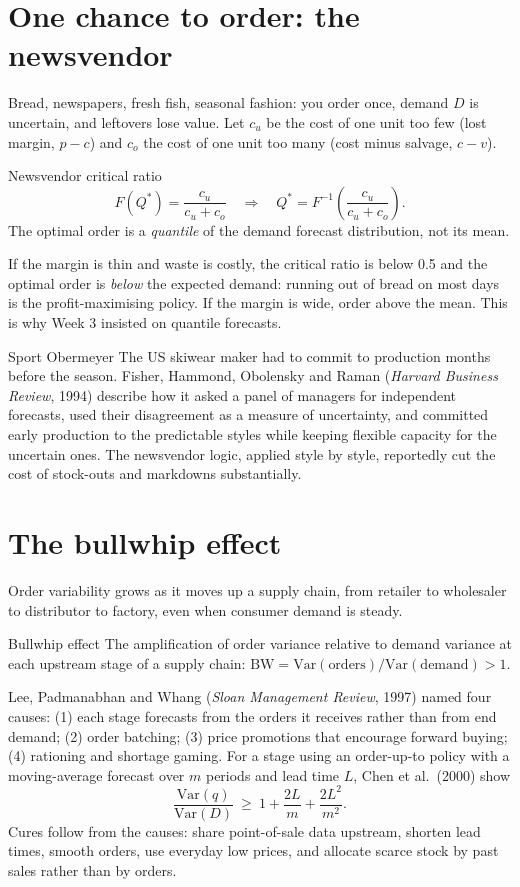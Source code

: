 \section{One chance to order: the newsvendor}
Bread, newspapers, fresh fish, seasonal fashion: you order once, demand $D$ is uncertain, and leftovers lose value.
Let $c_u$ be the cost of one unit too few (lost margin, $p-c$) and $c_o$ the cost of one unit too many (cost minus
salvage, $c-v$).
\begin{keyformula}{Newsvendor critical ratio}
\[ F(Q^*)=\frac{c_u}{c_u+c_o}\quad\Longrightarrow\quad Q^*=F^{-1}\!\left(\frac{c_u}{c_u+c_o}\right). \]
The optimal order is a \emph{quantile} of the demand forecast distribution, not its mean.
\end{keyformula}
If the margin is thin and waste is costly, the critical ratio is below 0.5 and the optimal order is \emph{below} the
expected demand: running out of bread on most days is the profit-maximising policy. If the margin is wide, order
above the mean. This is why Week 3 insisted on quantile forecasts.

\begin{realcase}{Sport Obermeyer}
The US skiwear maker had to commit to production months before the season. Fisher, Hammond, Obolensky and Raman
(\emph{Harvard Business Review}, 1994) describe how it asked a panel of managers for independent forecasts, used their
disagreement as a measure of uncertainty, and committed early production to the predictable styles while keeping
flexible capacity for the uncertain ones. The newsvendor logic, applied style by style, reportedly cut the cost of
stock-outs and markdowns substantially.
\end{realcase}

\section{The bullwhip effect}
Order variability grows as it moves up a supply chain, from retailer to wholesaler to distributor to factory, even
when consumer demand is steady.
\begin{definition}{Bullwhip effect}
The amplification of order variance relative to demand variance at each upstream stage of a supply chain:
$\mathrm{BW}=\mathrm{Var}(\text{orders})/\mathrm{Var}(\text{demand})>1$.
\end{definition}
Lee, Padmanabhan and Whang (\emph{Sloan Management Review}, 1997) named four causes: (1) each stage forecasts from the
orders it receives rather than from end demand; (2) order batching; (3) price promotions that encourage forward
buying; (4) rationing and shortage gaming. For a stage using an order-up-to policy with a moving-average forecast over
$m$ periods and lead time $L$, Chen et al.\ (2000) show
\[ \frac{\mathrm{Var}(q)}{\mathrm{Var}(D)}\ \ge\ 1+\frac{2L}{m}+\frac{2L^2}{m^2}. \]
Cures follow from the causes: share point-of-sale data upstream, shorten lead times, smooth orders, use everyday low
prices, and allocate scarce stock by past sales rather than by orders.

